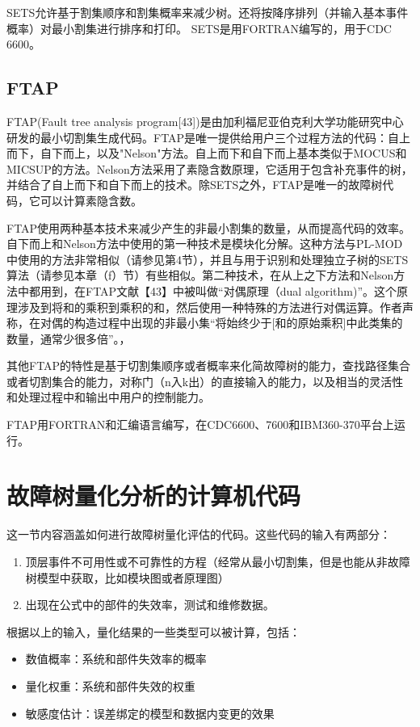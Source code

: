 \documentclass[cn,11pt,chinese]{elegantbook}
\begin{document}
{SETS允许基于割集顺序和割集概率来减少树。还将按降序排列（并输入基本事件概率）对最小割集进行排序和打印。 SETS是用FORTRAN编写的，用于CDC 6600。

\subsection{FTAP}

FTAP(Fault tree analysis program[43])是由加利福尼亚伯克利大学功能研究中心研发的最小切割集生成代码。FTAP是唯一提供给用户三个过程方法的代码：自上而下，自下而上，以及"Nelson"方法。自上而下和自下而上基本类似于MOCUS和MICSUP的方法。Nelson方法采用了素隐含数原理，它适用于包含补充事件的树，并结合了自上而下和自下而上的技术。除SETS之外，FTAP是唯一的故障树代码，它可以计算素隐含数。

FTAP使用两种基本技术来减少产生的非最小割集的数量，从而提高代码的效率。自下而上和Nelson方法中使用的第一种技术是模块化分解。这种方法与PL-MOD中使用的方法非常相似（请参见第4节），并且与用于识别和处理独立子树的SETS算法（请参见本章（f）节）有些相似。第二种技术，在从上之下方法和Nelson方法中都用到，在FTAP文献【43】中被叫做“对偶原理（dual algorithm)”。这个原理涉及到将和的乘积到乘积的和，然后使用一种特殊的方法进行对偶运算。作者声称，在对偶的构造过程中出现的非最小集“将始终少于[和的原始乘积]中此类集的数量，通常少很多倍”。，

其他FTAP的特性是基于切割集顺序或者概率来化简故障树的能力，查找路径集合或者切割集合的能力，对称门（n入k出）的直接输入的能力，以及相当的灵活性和处理过程中和输出中用户的控制能力。

FTAP用FORTRAN和汇编语言编写，在CDC6600、7600和IBM360-370平台上运行。

\section{故障树量化分析的计算机代码}

这一节内容涵盖如何进行故障树量化评估的代码。这些代码的输入有两部分：
\begin{enumerate}
	\item 顶层事件不可用性或不可靠性的方程（经常从最小切割集，但是也能从非故障树模型中获取，比如模块图或者原理图）
\item 出现在公式中的部件的失效率，测试和维修数据。
\end{enumerate}
根据以上的输入，量化结果的一些类型可以被计算，包括：
\begin{itemize}
	\item 数值概率：系统和部件失效率的概率
\item 量化权重：系统和部件失效的权重
\item 敏感度估计：误差绑定的模型和数据内变更的效果
\end{itemize}

}
\end{document}
